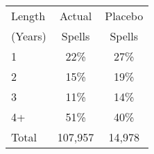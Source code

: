 \begin{tabular}{lcc}
\toprule
Length & Actual & Placebo \\
(Years) & Spells & Spells \\
\midrule
1 & 22\% & 27\% \\
2 & 15\% & 19\% \\
3 & 11\% & 14\% \\
4+ & 51\% & 40\% \\
Total &      107,957 &       14,978 \\
\bottomrule
\end{tabular}
